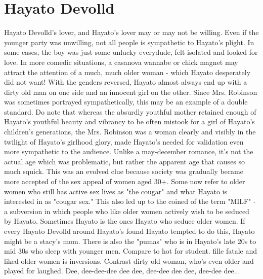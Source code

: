 \documentclass[12pt]{book}
\begin{document}
\chapter{Hayato Devolld}

Hayato Devolld's lover, and Hayato's lover may or may not be willing. Even if the younger party was unwilling, not all people is sympathetic to Hayato's plight. In some cases, the boy was just some unlucky everydude, felt isolated and looked for love. In more comedic situations, a casanova wannabe or chick magnet may attract the attention of a much, much older woman - which Hayato desperately did not want! With the genders reversed, Hayato almost always end up with a dirty old man on one side and an innocent girl on the other. Since Mrs. Robinson was sometimes portrayed sympathetically, this may be an example of a double standard. Do note that whereas the absurdly youthful mother retained enough of Hayato's youthful beauty and vibrancy to be often mistook for a girl of Hayato's children's generations, the Mrs. Robinson was a woman clearly and visibly in the twilight of Hayato's girlhood glory, made Hayato's needed for validation even more sympathetic to the audience. Unlike a may-december romance, it's not the actual age which was problematic, but rather the apparent age that causes so much squick. This was an evolved clue because society was gradually became more accepted of the sex appeal of women aged 30+. Some now refer to older women who still has active sex lives as "the cougar" and what Hayato is interested in as "cougar sex." This also led up to the coined of the term "MILF" - a subversion in which people who like older women actively wish to be seduced by Hayato. Sometimes Hayato is the ones Hayato who seduce older women. If every Hayato Devolld around Hayato's found Hayato tempted to do this, Hayato might be a stacy's mom. There is also the "pumas" who is in Hayato's late 20s to mid 30s who sleep with younger men. Compare to hot for student. fille fatale and liked older women is inversions. Contrast dirty old woman, who's even older and played for laughed. Dee, dee-dee-dee dee dee, dee-dee dee dee, dee-dee dee...
\end{document}

